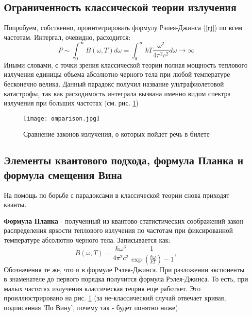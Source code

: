 \subsection{Ограниченность классической теории излучения}
Попробуем, собственно, проинтегрировать формулу Рэлея-Джинса (\ref{rj}) по всем частотам. Интергал, очевидно, расходится:
\begin{equation}
   P \sim \int_{0}^{\infty}  B(\omega, T) d\omega = \int_{0}^{\infty}  kT\frac{\omega^2}{4\pi^2 c^2}  d\omega \to \infty
\end{equation}
Иными словами, с точки зрения классической теории полная мощность теплового излучения единицы объема абсолютно черного тела при любой температуре бесконечно велика. Данный парадокс получил название ультрафиолетовой катастрофы, так как расходимость интеграла вызвана именно видом спектра излучения при больших частотах (см. рис. \ref{comparison})
\begin{figure}
    \centering
    \texttt{[image: omparison.jpg]}
    \caption{Сравнение законов излучения, о которых пойдет речь в билете}
    \label{comparison}
\end{figure}


\subsection{Элементы квантового подхода, формула Планка и формула смещения Вина}
На помощь по борьбе с парадоксами в классической теории снова приходят кванты. 


\textbf{Формула Планка} - полученный из квантово-статистических соображений закон распределения яркости теплового излучения по частотам при фиксированной температуре абсолютно черного тела. Записывается как:
\begin{equation}
\label{rj}
    B(\omega, T) = \frac{\hbar\omega^3}{4\pi^2 c^2}\frac{1}{\exp(\frac{\hbar\omega}{kT}) - 1},
\end{equation}
Обозначения те же, что и в формуле Рэлея-Джинса. При разложении экспоненты в знаменателе до первого порядка получится формула Рэлея-Джинса. То есть, при малых частотах излучения классическая теория еще работает. Это проиллюстрировано на рис. \ref{comparison} (за не-классический случай отвечает кривая, подписанная 'По Вину', почему так - будет понятно ниже).


